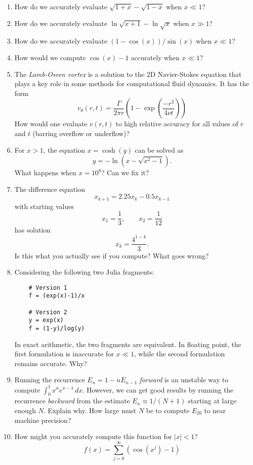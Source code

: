 \documentclass[12pt, leqno]{article}
\begin{document}
\begin{enumerate}
\item
  How do we accurately evaluate $\sqrt{1+x}-\sqrt{1-x}$ when $x \ll 1$?
\item
  How do we accurately evaluate $\ln \sqrt{x+1}-\ln\sqrt{x}$ when $x \gg 1$?
\item
  How do we accurately evaluate $(1-\cos(x))/\sin(x)$ when $x \ll 1$?
\item
  How would we compute $\cos(x)-1$ accurately when $x \ll 1$?
\item
  The {\em Lamb-Oseen vortex} is a solution to the 2D Navier-Stokes
  equation that plays a key role in some methods for computational
  fluid dynamics.  It has the form
  \[
    v_{\theta}(r,t) = \frac{\Gamma}{2 \pi r}
      \left( 1 - \exp\left( \frac{-r^2}{4 \nu t} \right) \right)
  \]
  How would one evaluate $v(r,t)$ to high relative accuracy for all
  values of $r$ and $t$ (barring overflow or underflow)?
\item
  For $x > 1$, the equation $x = \cosh(y)$ can be solved as
  \[
    y = -\ln\left(x - \sqrt{x^2-1}\right).
  \]
  What happens when $x = 10^8$?  Can we fix it?
\item
  The difference equation
  \[
    x_{k+1} = 2.25x_k - 0.5 x_{k-1}
  \]
  with starting values
  \[
    x_1 = \frac{1}{3}, \qquad x_2 = \frac{1}{12}
  \]
  has solution
  \[
    x_k = \frac{4^{1-k}}{3}.
  \]
  Is this what you actually see if you compute?  What goes wrong?
\item
  Considering the following two Julia fragments:
\begin{lstlisting}
    # Version 1
    f = (exp(x)-1)/x

    # Version 2
    y = exp(x)
    f = (1-y)/log(y)
\end{lstlisting}
  In exact arithmetic, the two fragments are equivalent.  In floating
  point, the first formulation is inaccurate for $x \ll 1$, while the
  second formulation remains accurate.  Why?
\item
  Running the recurrence $E_n = 1-nE_{n-1}$ {\em forward} is an
  unstable way to compute $\int_0^1 x^n e^{x-1} \, dx$.  However, we
  can get good results by running the recurrence {\em backward} from
  the estimate $E_n \approx 1/(N+1)$ starting at large enough $N$.
  Explain why.  How large must $N$ be to compute $E_{20}$ to near
  machine precision?
\item
  How might you accurately compute this function for $|x| < 1$?
  \[
    f(x) = \sum_{j=0}^\infty \left( \cos(x^j)-1 \right)
  \]
\end{enumerate}
\end{document}
